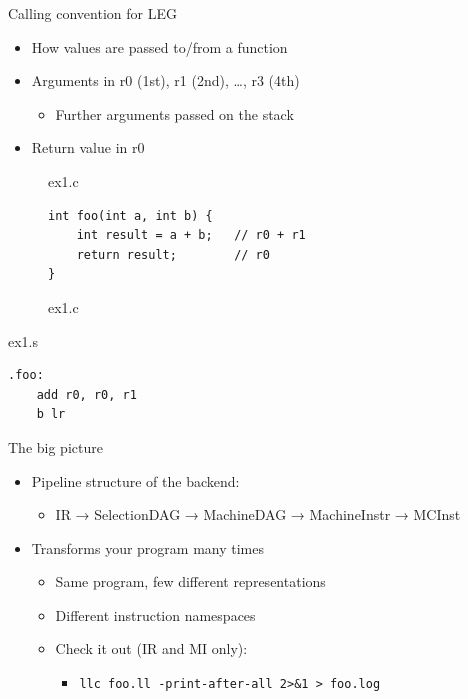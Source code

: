 
\begin{frame}[fragile]{Calling convention for LEG}

\begin{itemize}
    \item How values are passed to/from a function
    \item Arguments in r0 (1st), r1 (2nd), …, r3 (4th)
    \begin{itemize}
        \item Further arguments passed on the stack
    \end{itemize}
    \item Return value in r0
\end{itemize}

\begin{figure}{ex1.c}
\begin{Verbatim}[fontsize=\scriptsize,frame=single]
int foo(int a, int b) {
    int result = a + b;   // r0 + r1
    return result;        // r0
}
\end{Verbatim}
\caption{ex1.c}
\end{figure}

\begin{block}{ex1.s}
\begin{lstlisting}
.foo:
    add r0, r0, r1
    b lr
\end{lstlisting}
\end{block}

\end{frame}


\begin{frame}{The big picture}

\begin{itemize}
    \item Pipeline structure of the backend:
    \begin{itemize}
        \item IR → SelectionDAG → MachineDAG  → MachineInstr → MCInst
    \end{itemize}
    \item Transforms your program many times
    \begin{itemize}
        \item Same program, few different representations
        \item Different instruction namespaces
        \item Check it out (IR and MI only):
        \begin{itemize}
            \item \texttt{llc foo.ll -print-after-all 2>\&1 > foo.log}
        \end{itemize}
    \end{itemize}
\end{itemize}

\end{frame}

